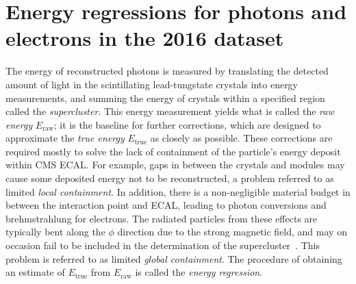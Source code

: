 \clearpage
\section{Energy regressions for photons and electrons in the 2016 dataset}
\label{app:regression}

\newcommand{\Eraw}{\ensuremath{E_\text{raw}}\xspace}
\newcommand{\Etrue}{\ensuremath{E_\text{true}}\xspace}
\newcommand{\Ecorr}{\ensuremath{E_\text{corr}}\xspace}

The energy of reconstructed photons is measured by translating the detected amount of light in the scintillating lead-tungstate crystals into energy measurements, and summing the energy of crystals within a specified region called the \textit{supercluster}.
% 
This energy measurement yields what is called the \textit{raw energy} $\Eraw$; it is the baseline for further corrections, which are designed to approximate the \textit{true energy} $\Etrue$ as closely as possible.
% 
These corrections are required mostly to solve the lack of containment of the particle's energy deposit within CMS ECAL.
% 
For example, gaps in between the crystals and modules may cause some deposited energy not to be reconstructed, a problem referred to as limited \textit{local containment}.
% 
In addition, there is a non-negligible material budget in between the interaction point and ECAL, leading to photon conversions and brehmstrahlung for electrons.
% 
The radiated particles from these effects are typically bent along the $\phi$ direction due to the strong magnetic field, and may on occasion fail to be included in the determination of the supercluster~\cite{Chatrchyan:2013dga}.
% 
This problem is referred to as limited \textit{global containment}.
% 
The procedure of obtaining an estimate of $\Etrue$ from $\Eraw$ is called the \textit{energy regression}.


